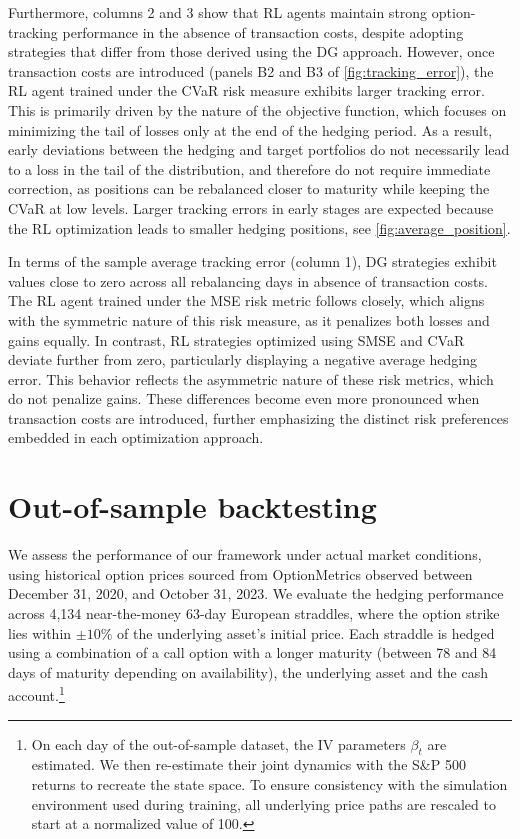\documentclass[12pt]{article}
\begin{document}
Furthermore, columns 2 and 3 show that RL agents maintain strong option-tracking performance in the absence of transaction costs, despite adopting strategies that differ from those derived using the DG approach. However, once transaction costs are introduced (panels B2 and B3 of \autoref{fig:tracking_error}), the RL agent trained under the CVaR risk measure exhibits larger tracking error. This is primarily driven by the nature of the objective function, which focuses on minimizing the tail of losses only at the end of the hedging period. As a result, early deviations between the hedging and target portfolios 
do not necessarily lead to a loss in the tail of the distribution, and therefore do not require immediate correction, as positions can be rebalanced closer to maturity while keeping the CVaR at low levels. Larger tracking errors in early stages are expected because the RL optimization leads to smaller hedging positions, see \autoref{fig:average_position}.

In terms of the sample average tracking error (column 1), DG strategies exhibit values close to zero across all rebalancing days in absence of transaction costs. The RL agent trained under the MSE risk metric follows closely, which aligns with the symmetric nature of this risk measure, as it penalizes both losses and gains equally.  
In contrast, RL strategies optimized using SMSE and CVaR deviate further from zero, particularly displaying a negative average hedging error. This behavior reflects the asymmetric nature of these risk metrics, which do not penalize gains. These differences become even more pronounced when transaction costs are introduced, further emphasizing the distinct risk preferences embedded in each optimization approach.

\section{Out-of-sample backtesting} \label{subsub:benchmarking_realpaths}

We assess the performance of our framework under actual market conditions, using historical option prices sourced from OptionMetrics observed between December 31, 2020, and October 31, 2023. We evaluate the hedging performance across 4,134 near-the-money 63-day European straddles, where the option strike lies within $\pm10\%$ of the underlying asset's initial price. Each straddle is hedged using a combination of a call option with a longer maturity (between 78 and 84 days of maturity depending on availability), the underlying asset and the cash account.\footnote{On each day of the out-of-sample dataset, the IV parameters $\beta_t$ are estimated.  We then re-estimate their joint dynamics with the S\&P 500 returns to recreate the state space. To ensure consistency with the simulation environment used during training, all underlying price paths are rescaled to start at a normalized value of 100.}
\end{document}
